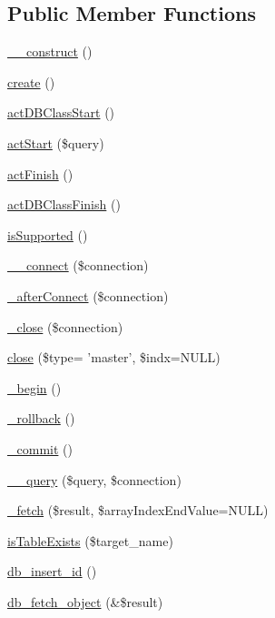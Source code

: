 \subsection*{Public Member Functions}
\begin{DoxyCompactItemize}
\item 
\hyperlink{classDBMysqlConnectWrapper_a8ad94ea4f17656d8049e061d5272e95d}{\+\_\+\+\_\+construct} ()
\item 
\hyperlink{classDBMysqlConnectWrapper_a64731408ca5d5f10faf1ab9dfc85d305}{create} ()
\item 
\hyperlink{classDBMysqlConnectWrapper_a092b8eb0055cf932453a06bc2e07ffa6}{act\+D\+B\+Class\+Start} ()
\item 
\hyperlink{classDBMysqlConnectWrapper_a72cd872ecf223861aa60c7a8e762006e}{act\+Start} (\$query)
\item 
\hyperlink{classDBMysqlConnectWrapper_a6134879360bf66676b06d2b90d08f231}{act\+Finish} ()
\item 
\hyperlink{classDBMysqlConnectWrapper_a441d399226f8b2ade5b83ecad2ee7fad}{act\+D\+B\+Class\+Finish} ()
\item 
\hyperlink{classDBMysqlConnectWrapper_a30f182dabfc36ca3d053f7804693945a}{is\+Supported} ()
\item 
\hyperlink{classDBMysqlConnectWrapper_a7742df749f6fd29ed8923424ec06aff1}{\+\_\+\+\_\+connect} (\$connection)
\item 
\hyperlink{classDBMysqlConnectWrapper_a6649b005573868b2e0864026d0dae97c}{\+\_\+after\+Connect} (\$connection)
\item 
\hyperlink{classDBMysqlConnectWrapper_a33cdc3d0b3f213b4fe15714465c71cc2}{\+\_\+close} (\$connection)
\item 
\hyperlink{classDBMysqlConnectWrapper_aa8d6e69f78e05738b4208dbee93b7e35}{close} (\$type= 'master', \$indx=N\+U\+L\+L)
\item 
\hyperlink{classDBMysqlConnectWrapper_a488d8ad018f1de7176019c44ee0be372}{\+\_\+begin} ()
\item 
\hyperlink{classDBMysqlConnectWrapper_a9404ef51cc9f734b3567df230c4e8a31}{\+\_\+rollback} ()
\item 
\hyperlink{classDBMysqlConnectWrapper_a593348857d1a458713ecb1c6e36ca86e}{\+\_\+commit} ()
\item 
\hyperlink{classDBMysqlConnectWrapper_a356376744b1a0db6142fc3f12aca038a}{\+\_\+\+\_\+query} (\$query, \$connection)
\item 
\hyperlink{classDBMysqlConnectWrapper_afb37dd9c37b126f7e30c08c5bf3e7b95}{\+\_\+fetch} (\$result, \$array\+Index\+End\+Value=N\+U\+L\+L)
\item 
\hyperlink{classDBMysqlConnectWrapper_a71d795c4840f3c7c3e143fd90b4f0e56}{is\+Table\+Exists} (\$target\+\_\+name)
\item 
\hyperlink{classDBMysqlConnectWrapper_a3b68647fbcd66de2149d16ed790e5001}{db\+\_\+insert\+\_\+id} ()
\item 
\hyperlink{classDBMysqlConnectWrapper_abde4e0c8c4c315e39d7c1698370314f8}{db\+\_\+fetch\+\_\+object} (\&\$result)
\end{DoxyCompactItemize}
